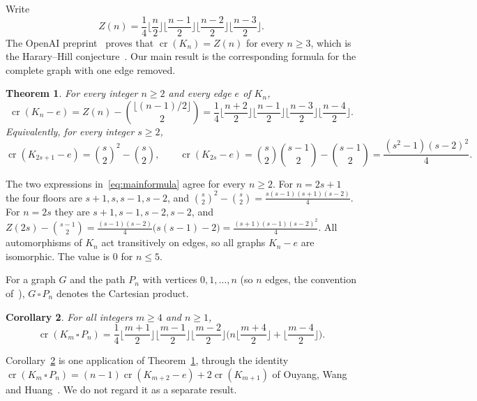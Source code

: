 \documentclass[11pt,a4paper]{article}
\newtheorem{maintheorem}{Theorem}
\newtheorem{maincorollary}[maintheorem]{Corollary}
\theoremstyle{definition}
\theoremstyle{remark}
\numberwithin{equation}{section}
\newcommand{\crn}{\operatorname{cr}}
\begin{document}
Write
\[
Z(n)=\frac14\Big\lfloor\frac n2\Big\rfloor\Big\lfloor\frac{n-1}2\Big\rfloor\Big\lfloor\frac{n-2}2\Big\rfloor\Big\lfloor\frac{n-3}2\Big\rfloor .
\]
The OpenAI preprint~\cite[Theorem~1.1]{OAIKn} proves that $\crn(K_n)=Z(n)$ for every $n\ge 3$, which is the Harary--Hill conjecture~\cite{HararyHill1963}. Our main result is the corresponding formula for the complete graph with one edge removed.

\begin{maintheorem}\label{thm:A}
For every integer $n\ge 2$ and every edge $e$ of $K_n$,
\begin{equation}\label{eq:mainformula}
\crn(K_n-e)=Z(n)-\binom{\lfloor (n-1)/2\rfloor}{2}
=\frac14\Big\lfloor\frac{n+2}{2}\Big\rfloor\Big\lfloor\frac{n-1}{2}\Big\rfloor\Big\lfloor\frac{n-3}{2}\Big\rfloor\Big\lfloor\frac{n-4}{2}\Big\rfloor .
\end{equation}
Equivalently, for every integer $s\ge 2$,
\begin{equation}\label{eq:parity}
\crn(K_{2s+1}-e)=\binom{s}{2}^{2}-\binom{s}{2},
\qquad
\crn(K_{2s}-e)=\binom{s}{2}\binom{s-1}{2}-\binom{s-1}{2}=\frac{(s^2-1)(s-2)^2}{4}.
\end{equation}
\end{maintheorem}

The two expressions in~\eqref{eq:mainformula} agree for every $n\ge2$. For $n=2s+1$ the four floors are $s+1,s,s-1,s-2$, and $\binom s2^2-\binom s2=\frac{s(s-1)(s+1)(s-2)}{4}$. For $n=2s$ they are $s+1,s-1,s-2,s-2$, and $Z(2s)-\binom{s-1}2=\frac{(s-1)(s-2)}{4}\bigl(s(s-1)-2\bigr)=\frac{(s+1)(s-1)(s-2)^2}{4}$. All automorphisms of $K_n$ act transitively on edges, so all graphs $K_n-e$ are isomorphic. The value is $0$ for $n\le5$.

For a graph $G$ and the path $P_n$ with vertices $0,1,\dots,n$ (so $n$ edges, the convention of~\cite[Section~5]{OWH}), $G\,\square\,P_n$ denotes the Cartesian product.

\begin{maincorollary}\label{cor:B}
For all integers $m\ge4$ and $n\ge1$,
\begin{equation}\label{eq:zheng}
\crn(K_m\,\square\,P_n)=\frac14\Big\lfloor\frac{m+1}{2}\Big\rfloor\Big\lfloor\frac{m-1}{2}\Big\rfloor\Big\lfloor\frac{m-2}{2}\Big\rfloor\Big(n\Big\lfloor\frac{m+4}{2}\Big\rfloor+\Big\lfloor\frac{m-4}{2}\Big\rfloor\Big).
\end{equation}
\end{maincorollary}

Corollary~\ref{cor:B} is one application of Theorem~\ref{thm:A}, through the identity $\crn(K_m\,\square\,P_n)=(n-1)\crn(K_{m+2}-e)+2\crn(K_{m+1})$ of Ouyang, Wang and Huang~\cite[Corollary~5.1]{OWH}. We do not regard it as a separate result.
\end{document}
